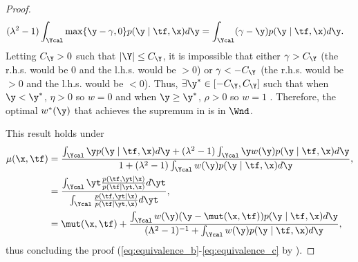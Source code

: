 \begin{lemma}
\begin{proof}
\begin{equation}
\begin{split}
                (\lambda^2 - 1)\int_{\Ycal} \max\{\y - \gamma, 0\} p(\y \mid \tf, \x)d\y  &= \int_{\Ycal} (\gamma - \y) p(\y \mid \tf, \x) d\y.
            \end{split}
        \end{equation}
        Letting $C_{\Y} > 0$ such that $|\Y| \leq C_{\Y}$, it is impossible that either $\gamma > C_{\Y}$ (the r.h.s. would be $0$ and the l.h.s. would be $>0$) or $\gamma < -C_{\Y}$ (the r.h.s. would be $>0$ and the l.h.s. would be $<0$). 
        Thus, $\exists \y^{*} \in [-C_{\Y}, C_{\Y}]$ such that when $\y < \y^{*}$, $\eta > 0$ so $w = 0$ and when $\y \geq \y^{*}$, $\rho > 0$ so $w = 1$ . 
        Therefore, the optimal $w^*(\y)$ that achieves the supremum in  is in $\Wnd$. 
        
        This result holds under
        \begin{subequations}
            \begin{align}
                \mu(\x, \tf) 
                &= \frac{\int_{\Ycal} \y p(\y \mid \tf, \x)d\y + (\lambda^2 - 1)\int_{\Ycal} \y w(\y)p(\y \mid \tf, \x)d\y}{1 + (\lambda^2 - 1)\int_{\Ycal} w(\y)p(\y \mid \tf, \x)d\y},\\
                &= \frac{\int_{\Ycal} \yt \frac{p(\tf, \yt \mid \x)}{p(\tf \mid \yt, \x)}d\yt}{\int_{\Ycal} \frac{p(\tf, \yt \mid \x)}{p(\tf \mid \yt, \x)}d\yt}, \label{eq:equivalence_b}\\
                &= \mut(\x, \tf) + \frac{\int_\Ycal w(\y) (\y - \mut(\x, \tf)) p(\y \mid \tf, \x)d\y}{(\Lambda^2 - 1)^{-1} + \int_\Ycal w(\y)p(\y \mid \tf, \x)d\y} \label{eq:equivalence_c},
            \end{align}
        \end{subequations}
        thus concluding the proof (\cref{eq:equivalence_b}-\cref{eq:equivalence_c} by ).
    \end{proof}
\end{lemma}